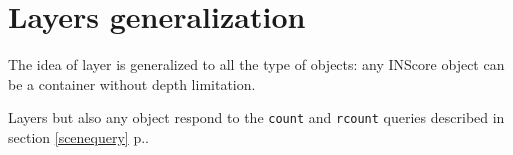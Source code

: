 \documentclass[a4paper,twoside]{report}
\newcommand{\sublevel}[1]	{\section{#1}}
\newcommand{\fullref}[1]	{\ref{#1} p.\pageref{#1}}
\newcommand{\OSC}[1]		{\texttt{#1}}
\begin{document}
\sublevel{Layers generalization}
\label{layersgen}

The idea of layer is generalized to all the type of objects: any INScore object can be a container without depth limitation. 

Layers but also any object respond to the \OSC{count} and \OSC{rcount} queries described in section \fullref{scenequery}.



%





%
%

\end{document}
